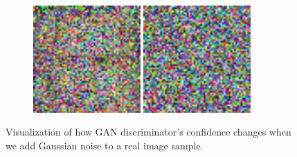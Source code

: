 \begin{figure}[h]
\begin{subfigure}[b]{0.5\textwidth}
		\includegraphics[width=0.45\textwidth]{figures/diversity_gan2_fake_dis_gen_images_var_50}
		\includegraphics[width=0.45\textwidth]{figures/diversity_gan2_fake_dis_gen_images_var_90}
	\end{subfigure}
	\caption{Visualization of how GAN discriminator's confidence changes when we add Gaussian noise to a real image sample.}
	\label{fig:changed_gen_image_fake_dis}
\end{figure}

